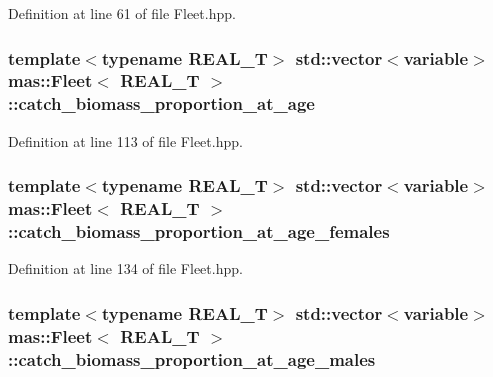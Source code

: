 Definition at line 61 of file Fleet.\-hpp.

\hypertarget{structmas_1_1_fleet_ab29452b064132572243fbbb6ce7e8c06}{
\subsubsection[{catch\-\_\-biomass\-\_\-proportion\-\_\-at\-\_\-age}]{\setlength{\rightskip}{0pt plus 5cm}template$<$typename R\-E\-A\-L\-\_\-\-T$>$ std\-::vector$<${\bf variable}$>$ {\bf mas\-::\-Fleet}$<$ R\-E\-A\-L\-\_\-\-T $>$\-::catch\-\_\-biomass\-\_\-proportion\-\_\-at\-\_\-age}}\label{structmas_1_1_fleet_ab29452b064132572243fbbb6ce7e8c06}


Definition at line 113 of file Fleet.\-hpp.

\hypertarget{structmas_1_1_fleet_a461ed479ae0c386f261777e33a111e93}{
\subsubsection[{catch\-\_\-biomass\-\_\-proportion\-\_\-at\-\_\-age\-\_\-females}]{\setlength{\rightskip}{0pt plus 5cm}template$<$typename R\-E\-A\-L\-\_\-\-T$>$ std\-::vector$<${\bf variable}$>$ {\bf mas\-::\-Fleet}$<$ R\-E\-A\-L\-\_\-\-T $>$\-::catch\-\_\-biomass\-\_\-proportion\-\_\-at\-\_\-age\-\_\-females}}\label{structmas_1_1_fleet_a461ed479ae0c386f261777e33a111e93}


Definition at line 134 of file Fleet.\-hpp.

\hypertarget{structmas_1_1_fleet_aa15871c1252f3fc4f0d5eb19376ef18c}{
\subsubsection[{catch\-\_\-biomass\-\_\-proportion\-\_\-at\-\_\-age\-\_\-males}]{\setlength{\rightskip}{0pt plus 5cm}template$<$typename R\-E\-A\-L\-\_\-\-T$>$ std\-::vector$<${\bf variable}$>$ {\bf mas\-::\-Fleet}$<$ R\-E\-A\-L\-\_\-\-T $>$\-::catch\-\_\-biomass\-\_\-proportion\-\_\-at\-\_\-age\-\_\-males}}\label{structmas_1_1_fleet_aa15871c1252f3fc4f0d5eb19376ef18c}


